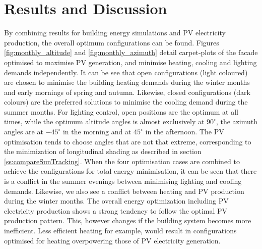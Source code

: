\chapter{Results and Discussion}
\label{ch:results}



By combining results for building energy simulations and PV electricity production, the overall optimum configurations can be found. Figures \ref{fig:monthly_altitude} and \ref{fig:monthly_azimuth} detail carpet-plots of the facade optimised to maximise PV generation, and minimise heating, cooling and lighting demands independently. It can be see that open configurations (light coloured) are chosen to minimise the building heating demands during the winter months and early mornings of spring and autumn. Likewise, closed configurations (dark colours) are the preferred solutions to minimise the cooling demand during the summer months. For lighting control, open positions are the optimum at all times, while the optimum altitude angles is almost exclusively at $90^{\circ}$, the azimuth angles are at $-45^{\circ}$ in the morning and at $45^{\circ}$  in the afternoon. The PV optimisation tends to choose angles that are not that extreme, corresponding to the minimization of longitudinal shading as described in section \ref{ss:compareSunTracking}. When the four optimisation cases are combined to achieve the configurations for total energy minimisation, it can be seen that there is a conflict in the summer evenings between minimising lighting and cooling demands. Likewise, we also see a conflict between heating and PV production during the winter months. The overall energy optimization including PV electricity production shows a strong tendency to follow the optimal PV production pattern. This, however changes if the building system becomes more inefficient. Less efficient heating for example, would result in configurations optimised for heating overpowering those of PV electricity generation.




